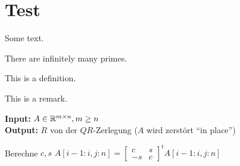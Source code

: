 \chapter{Test}

Some text.

\begin{theorem}
    There are infinitely many primes.
\end{theorem}

\begin{definition}
    This is a definition.
\end{definition}

\begin{remark}
    This is a remark.
\end{remark}

\begin{algorithm}[H]
    \caption{}
    \textbf{Input:} $A\in\mathbb{R}^{m\times n},m\geq n$\\
    \textbf{Output:} $R$ von der $QR$-Zerlegung ($A$ wird zerstört ``in place'')
    \begin{algorithmic}
            \State Berechne $c,s$
            \State $A[i-1:i,j:n]=\begin{bmatrix}
                c & s \\
                -s & c 
            \end{bmatrix}^t A[i-1:i,j:n]$
        \EndFor
    \EndFor
    \end{algorithmic}
\end{algorithm}